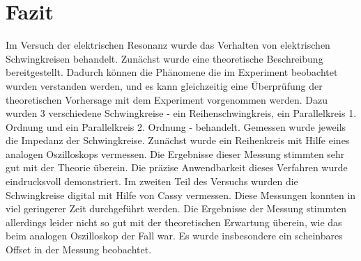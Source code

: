 \chapter{Fazit}
Im Versuch der elektrischen Resonanz wurde das Verhalten von elektrischen Schwingkreisen behandelt. Zunächst wurde eine theoretische Beschreibung bereitgestellt. Dadurch können die Phänomene die im Experiment beobachtet wurden verstanden werden, und es kann gleichzeitig eine Überprüfung der theoretischen Vorhersage mit dem Experiment vorgenommen werden. Dazu wurden 3 verschiedene Schwingkreise - ein Reihenschwingkreis, ein Parallelkreis 1. Ordnung und ein Parallelkreis 2. Ordnung - behandelt. Gemessen wurde jeweils die Impedanz der Schwingkreise. Zunächst wurde ein Reihenkreis mit Hilfe eines analogen Oszilloskops vermessen. Die Ergebnisse dieser Messung stimmten sehr gut mit der Theorie überein. Die präzise Anwendbarkeit dieses Verfahren wurde eindrucksvoll demonstriert. Im zweiten Teil des Versuchs wurden die Schwingkreise digital mit Hilfe von Cassy vermessen. Diese Messungen konnten in viel geringerer Zeit durchgeführt werden. Die Ergebnisse der Messung stimmten allerdings leider nicht so gut mit der theoretischen Erwartung überein, wie das beim analogen Oszilloskop der Fall war. Es wurde insbesondere ein scheinbares Offset in der Messung beobachtet.